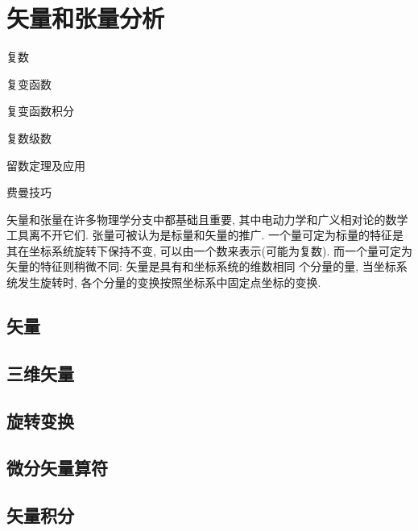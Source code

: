 
\chapter{矢量和张量分析}
\begin{introduction}
\item 复数
\item 复变函数
\item 复变函数积分
\item 复数级数
\item 留数定理及应用
\item 费曼技巧
\end{introduction}

矢量和张量在许多物理学分支中都基础且重要, 
其中电动力学和广义相对论的数学工具离不开它们.
张量可被认为是标量和矢量的推广. 一个量可定为标量的特征是
其在坐标系统旋转下保持不变, 可以由一个数来表示(可能为复数).
而一个量可定为矢量的特征则稍微不同: 矢量是具有和坐标系统的维数相同
个分量的量, 
当坐标系统发生旋转时, 各个分量的变换按照坐标系中固定点坐标的变换.
\section{矢量}
% 
\section{三维矢量}
% 

% 
% 
% 

\section{旋转变换}

\section{微分矢量算符}

\section{矢量积分}

% 
% 
% 
% 
% 
% 
% 
% 
% 
% 
% 
% 

